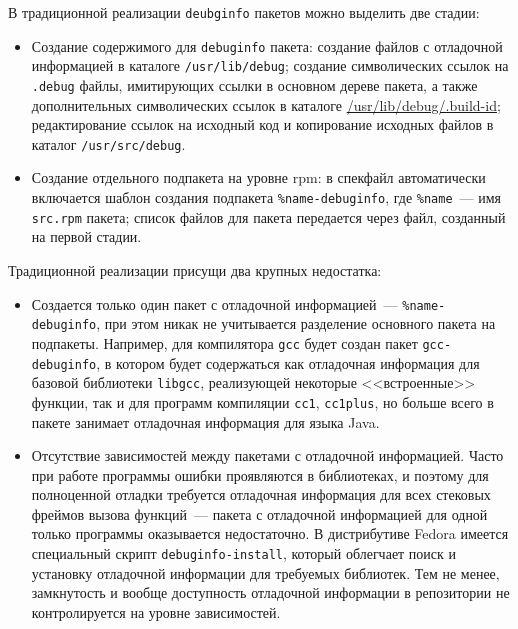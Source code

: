 \documentclass[russian,a4paper,12pt,titlepage]{article}
\begin{document}
В традиционной реализации \verb|deubginfo| пакетов можно выделить две стадии:
\begin{itemize}
\item Создание содержимого для \verb|debuginfo| пакета: создание файлов с отладочной информацией
в каталоге \verb|/usr/lib/debug|; создание символических ссылок на \verb|.debug| файлы, имитирующих
ссылки в основном дереве пакета, а также дополнительных символических ссылок в каталоге \url{/usr/lib/debug/.build-id};
редактирование ссылок на исходный код и копирование исходных файлов в каталог \verb|/usr/src/debug|.
\item Создание отдельного подпакета на уровне rpm: в спекфайл автоматически включается шаблон создания
подпакета \verb|%name-debuginfo|, где \verb|%name|~--- имя \verb|src.rpm| пакета; список файлов для пакета
передается через файл, созданный на первой стадии.
\end{itemize}

Традиционной реализации присущи два крупных недостатка:
\begin{itemize}
\item Создается только один пакет с отладочной информацией~--- \verb|%name-debuginfo|, при этом никак не учитывается
разделение основного пакета на подпакеты.  Например, для компилятора \verb|gcc| будет создан пакет \verb|gcc-debuginfo|,
в котором будет содержаться как отладочная информация для базовой библиотеки \verb|libgcc|, реализующей некоторые <<встроенные>>
функции, так и для программ компиляции \verb|cc1|, \verb|cc1plus|, но больше всего в пакете занимает отладочная информация для языка Java.
\item Отсутствие зависимостей между пакетами с отладочной информацией.  Часто при работе программы ошибки проявляются в библиотеках,
и поэтому для полноценной отладки требуется отладочная информация для всех стековых фреймов вызова функций~--- пакета с отладочной
информацией для одной только программы оказывается недостаточно.  В дистрибутиве Fedora имеется специальный скрипт \verb|debuginfo-install|,
который облегчает поиск и установку отладочной информации для требуемых библиотек.
Тем не менее, замкнутость и вообще доступность отладочной информации в репозитории не контролируется на уровне зависимостей.
\end{itemize}
\end{document}
